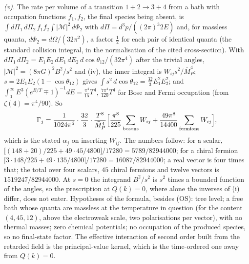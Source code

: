 \emph{(v).} The rate per volume of a transition $1 + 2 \to 3 + 4$ from a bath with occupation functions $f_{1}, f_{2}$, the final species being absent, is $\int d\Pi_{1}\,d\Pi_{2}\,f_{1}f_{2}\int|\mathcal{M}|^{2}\,d\Phi_{2}$ with $d\Pi = d^{3}p/((2\pi)^{3}2E)$ and, for massless quanta, $d\Phi_{2} = d\Omega/(32\pi^{2})$, a factor $\tfrac12$ for each pair of identical quanta (the standard collision integral, in the normalisation of the cited cross-section). With $d\Pi_{1}\,d\Pi_{2} = E_{1}E_{2}\,dE_{1}\,dE_{2}\,d\cos\theta_{12}/(32\pi^{4})$ after the trivial angles, $|\mathcal{M}|^{2} = (8\pi G)^{2}B^{2}/s^{2}$ and (iv), the inner integral is $W_{ij}s^{2}/\bar{M}_{P}^{4}$; $s = 2E_{1}E_{2}(1 - \cos\theta_{12})$ gives $\int s^{2}\,d\cos\theta_{12} = \tfrac{32}{3}E_{1}^{2}E_{2}^{2}$; and $\int_{0}^{\infty}E^{3}(e^{E/T} \mp 1)^{-1}dE = \tfrac{\pi^{4}}{15}T^{4}$, $\tfrac{7\pi^{4}}{120}T^{4}$ for Bose and Fermi occupation (from $\zeta(4) = \pi^{4}/90$). So
\[
\Gamma_{j} = \frac{1}{1024\pi^{6}}\cdot\frac{32}{3}\cdot\frac{T^{8}}{\bar{M}_{P}^{4}}\Bigl[\frac{\pi^{8}}{225}\sum_{\text{bosons}}W_{ij} + \frac{49\pi^{8}}{14400}\sum_{\text{fermions}}W_{ij}\Bigr],
\]
which is the stated $\alpha_{j}$ on inserting $W_{ij}$. The numbers follow: for a scalar, $\bigl[(148 + 20)/225 + 49 \cdot 45/4800\bigr]/17280 = 5789/82944000$; for a chiral fermion $\bigl[3 \cdot 148/225 + 49 \cdot 135/4800\bigr]/17280 = 16087/82944000$; a real vector is four times that; the total over four scalars, $45$ chiral fermions and twelve vectors is $1519247/82944000$. At $s = 0$ the integrand $B^{2}/s^{2}$ is $s^{2}$ times a bounded function of the angles, so the prescription at $Q(k) = 0$, where alone the inverses of (i) differ, does not enter. Hypotheses of the formula, besides (OS): tree level; a free bath whose quanta are massless at the temperature in question (for the content $(4, 45, 12)$, above the electroweak scale, two polarisations per vector), with no thermal masses; zero chemical potentials; no occupation of the produced species, so no final-state factor. The effective interaction of second order built from the retarded field is the principal-value kernel, which is the time-ordered one away from $Q(k) = 0$.


